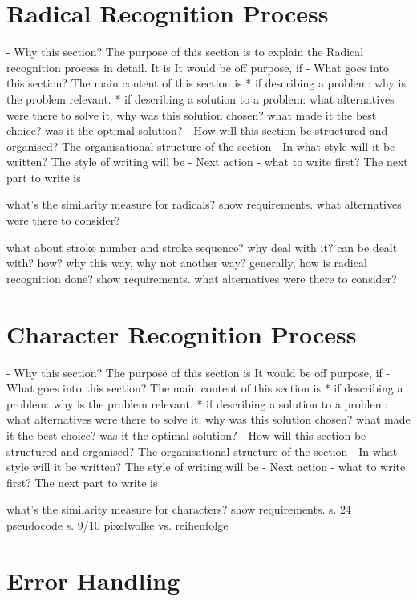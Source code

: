 \section{Radical Recognition Process}
\label{sec:hwre:radicalrecognitionprocess}

- Why this section? 
  The purpose of this section is to explain the Radical recognition process in
  detail. It is 
  It would be off purpose, if 
- What goes into this section?
  The main content of this section is 
  * if describing a problem: why is the problem relevant.
  * if describing a solution to a problem: what alternatives were
    there to solve it, why was this solution chosen? 
    what made it the best choice? was it the optimal solution?
- How will this section be structured and organised?
  The organisational structure of the section 
- In what style will it be written?
  The style of writing will be 
- Next action - what to write first?
  The next part to write is


what's the similarity measure for
radicals?
show requirements.
what alternatives were there to consider?

what about stroke number and stroke sequence?
why deal with it? can be dealt with? 
how? why this way, why not another way?
generally, how is radical recognition done?
show requirements.
what alternatives were there to consider?

\section{Character Recognition Process}
\label{sec:hwre:characterrecognitionprocess}

- Why this section? 
  The purpose of this section is 
  It would be off purpose, if 
- What goes into this section?
  The main content of this section is 
  * if describing a problem: why is the problem relevant.
  * if describing a solution to a problem: what alternatives were
    there to solve it, why was this solution chosen? 
    what made it the best choice? was it the optimal solution?
- How will this section be structured and organised?
  The organisational structure of the section 
- In what style will it be written?
  The style of writing will be 
- Next action - what to write first?
  The next part to write is


what's the similarity measure for
characters?
show requirements.
s. 24 pseudocode
s. 9/10 pixelwolke vs. reihenfolge

\section{Error Handling}
\label{sec:hwre:errorhandling}

